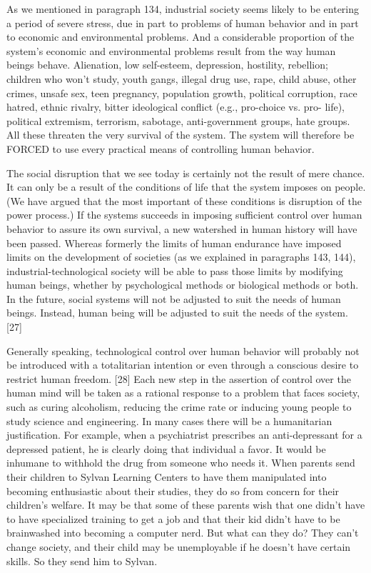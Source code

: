  As we mentioned in paragraph 134, industrial society seems likely to be entering a period of severe stress, due in part to problems of human behavior and in part to economic and environmental problems. And a considerable proportion of the system’s economic and environmental problems result from the way human beings behave. Alienation, low self-esteem, depression, hostility, rebellion; children who won’t study, youth gangs, illegal drug use, rape, child abuse, other crimes, unsafe sex, teen pregnancy, population growth, political corruption, race hatred, ethnic rivalry, bitter ideological conflict (e.g., pro-choice vs. pro- life), political extremism, terrorism, sabotage, anti-government groups, hate groups. All these threaten the very survival of the system. The system will therefore be FORCED to use every practical means of controlling human behavior.

 The social disruption that we see today is certainly not the result of mere chance. It can only be a result of the conditions of life that the system imposes on people. (We have argued that the most important of these conditions is disruption of the power process.) If the systems succeeds in imposing sufficient control over human behavior to assure its own survival, a new watershed in human history will have been passed. Whereas formerly the limits of human endurance have imposed limits on the development of societies (as we explained in paragraphs 143, 144), industrial-technological society will be able to pass those limits by modifying human beings, whether by psychological methods or biological methods or both. In the future, social systems will not be adjusted to suit the needs of human beings. Instead, human being will be adjusted to suit the needs of the system. [27]

 Generally speaking, technological control over human behavior will probably not be introduced with a totalitarian intention or even through a conscious desire to restrict human freedom. [28] Each new step in the assertion of control over the human mind will be taken as a rational response to a problem that faces society, such as curing alcoholism, reducing the crime rate or inducing young people to study science and engineering. In many cases there will be a humanitarian justification. For example, when a psychiatrist prescribes an anti-depressant for a depressed patient, he is clearly doing that individual a favor. It would be inhumane to withhold the drug from someone who needs it. When parents send their children to Sylvan Learning Centers to have them manipulated into becoming enthusiastic about their studies, they do so from concern for their children’s welfare. It may be that some of these parents wish that one didn’t have to have specialized training to get a job and that their kid didn’t have to be brainwashed into becoming a computer nerd. But what can they do? They can’t change society, and their child may be unemployable if he doesn’t have certain skills. So they send him to Sylvan.

